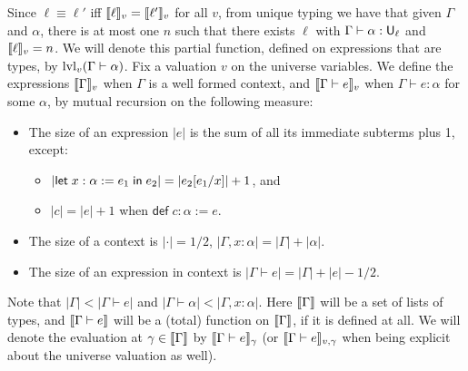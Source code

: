 Since $\ell\equiv\ell'$ iff $\llbracket \ell\rrbracket_v=\llbracket \ell'\rrbracket_v$ for all $v$, from unique typing we have that given $\Gamma$ and $\alpha$, there is at most one $n$ such that there exists $\ell$ with $\Gamma\vdash\alpha:\U_\ell$ and $\llbracket \ell\rrbracket_v=n$. We will denote this partial function, defined on expressions that are types, by $\lvl_v(\Gamma\vdash\alpha)$.
Fix a valuation $v$ on the universe variables. We define the expressions $\scott{\Gamma}_v$ when $\Gamma$ is a well formed context, and $\scott{\Gamma\vdash e}_v$ when $\Gamma\vdash e:\alpha$ for some $\alpha$, by mutual recursion on the following measure:
\begin{itemize}
\item The size of an expression $|e|$ is the sum of all its immediate subterms plus 1, except:
\begin{itemize}
\item $|\mathsf{let}\;x:\alpha:=e_1\mathrel{\mathsf{in}}e_2|=|e_2[e_1/x]|+1$, and
\item $|c|=|e|+1$ when $\mathsf{def}\;c:\alpha:=e$.
\end{itemize}
\item The size of a context is $|{\cdot}|=1/2$, $|\Gamma,x:\alpha|=|\Gamma|+|\alpha|$.
\item The size of an expression in context is $|\Gamma\vdash e|=|\Gamma|+|e|-1/2$.
\end{itemize}
Note that $|\Gamma|<|\Gamma\vdash e|$ and $|\Gamma\vdash\alpha|<|\Gamma,x:\alpha|$. Here $\scott{\Gamma}$ will be a set of lists of types, and $\scott{\Gamma\vdash e}$ will be a (total) function on $\scott{\Gamma}$, if it is defined at all. We will denote the evaluation at $\gamma\in\scott{\Gamma}$ by $\scott{\Gamma\vdash e}_\gamma$ (or $\scott{\Gamma\vdash e}_{v,\gamma}$ when being explicit about the universe valuation as well).

